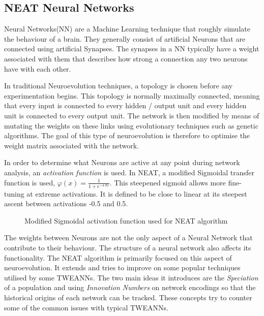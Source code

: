 \documentclass[]{Learning-to-Play-Wolfenstein-thesis}
\begin{document}
			
\subsection{\label{}NEAT Neural Networks}
Neural Networks(NN) are a Machine Learning technique that roughly simulate the behaviour of a brain. They generally consist of artificial Neurons that are connected using artificial Synapses. The synapses in a NN typically have a weight associated with them that describes how strong a connection any two neurons have with each other.

In traditional Neuroevolution techniques, a topology is chosen before any experimentation begins. This topology is normally maximally connected, meaning that every input is connected to every hidden / output unit and every hidden unit is connected to every output unit. The network is then modified by means of mutating the weights on these links using evolutionary techniques such as genetic algorithms. The goal of this type of neuroevolution is therefore to optimise the weight matrix associated with the network.

In order to determine what Neurons are active at any point during network analysis, an \textit{activation function} is used. In NEAT, a modified Sigmoidal transfer function is used, {$\varphi(x) = \frac{1}{1 + e^{-4.9x}}$}. This steepened sigmoid allows more fine-tuning at extreme activations. It is defined to be close to linear at its steepest ascent between activations -0.5 and 0.5. ~\cite{NEAT:sigmoid}

\begin{figure}[h]
\centering
\fboxsep 2mm
\caption{\label{fig:NEAT_sigmoid} Modified Sigmoidal activation function used for NEAT algorithm}
\end{figure} 
The weights between Neurons are not the only aspect of a Neural Network that contribute to their behaviour. The structure of a neural network also affects its functionality. The NEAT algorithm is primarily focused on this aspect of neuroevolution. It extends and tries to improve on some popular techniques utilised by some TWEANNs. The two main ideas it introduces are the \textit{Speciation} of a population and using \textit{Innovation Numbers} on network encodings so that the historical origins of each network can be tracked. These concepts try to counter some of the common issues with typical TWEANNs.\\
\end{document}
